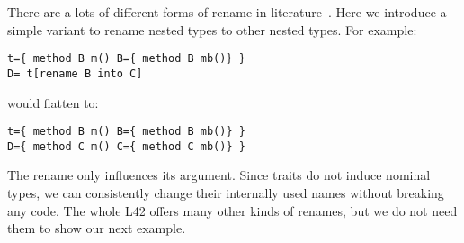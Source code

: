 


There are a lots of different forms of rename in
literature~\cite{deep,ancona2002calculus,bracha1992programming}.
Here we introduce a simple variant to rename nested types to other nested types.
For example:
\begin{lstlisting}
t={ method B m() B={ method B mb()} }
D= t[rename B into C]
\end{lstlisting}
would flatten to:
\begin{lstlisting}
t={ method B m() B={ method B mb()} }
D={ method C m() C={ method C mb()} }
\end{lstlisting}
The rename only influences its argument.
Since traits do not induce nominal types, we can
consistently change their
internally used names without breaking any code.
The whole L42 offers many other kinds of renames, but we do not need them to show our next example.


